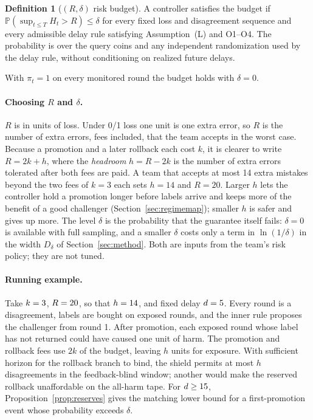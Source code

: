 \documentclass[10pt]{article}
\theoremstyle{plain}
\theoremstyle{definition}
\newtheorem{definition}{Definition}
\newcommand{\PP}{\mathbb{P}}
\begin{document}
\begin{definition}[$(R,\delta)$ risk budget]
A controller satisfies the budget if $\PP(\sup_{t\le T}H_t>R)\le\delta$ for every fixed loss and disagreement sequence and every admissible delay rule satisfying Assumption~(L) and O1--O4. The probability is over the query coins and any independent randomization used by the delay rule, without conditioning on realized future delays.
\end{definition}
With $\pi_t=1$ on every monitored round the budget holds with $\delta=0$.

\paragraph{Choosing $R$ and $\delta$.}
$R$ is in units of loss. Under 0/1 loss one unit is one extra error, so $R$ is the number of extra errors, fees included, that the team accepts in the worst case. Because a promotion and a later rollback each cost $k$, it is clearer to write $R=2k+h$, where the \emph{headroom} $h=R-2k$ is the number of extra errors tolerated after both fees are paid. A team that accepts at most 14 extra mistakes beyond the two fees of $k=3$ each sets $h=14$ and $R=20$. Larger $h$ lets the controller hold a promotion longer before labels arrive and keeps more of the benefit of a good challenger (Section~\ref{sec:regimemap}); smaller $h$ is safer and gives up more. The level $\delta$ is the probability that the guarantee itself fails: $\delta=0$ is available with full sampling, and a smaller $\delta$ costs only a term in $\ln(1/\delta)$ in the width $D_\delta$ of Section~\ref{sec:method}. Both are inputs from the team's risk policy; they are not tuned.

\paragraph{Running example.}\label{par:example}
Take $k=3$, $R=20$, so that $h=14$, and fixed delay $d=5$. Every round is a disagreement, labels are bought on exposed rounds, and the inner rule proposes the challenger from round 1. After promotion, each exposed round whose label has not returned could have caused one unit of harm. The promotion and rollback fees use $2k$ of the budget, leaving $h$ units for exposure. With sufficient horizon for the rollback branch to bind, the shield permits at most $h$ disagreements in the feedback-blind window; another would make the reserved rollback unaffordable on the all-harm tape. For $d\ge15$, Proposition~\ref{prop:reserves} gives the matching lower bound for a first-promotion event whose probability exceeds $\delta$.
\end{document}
